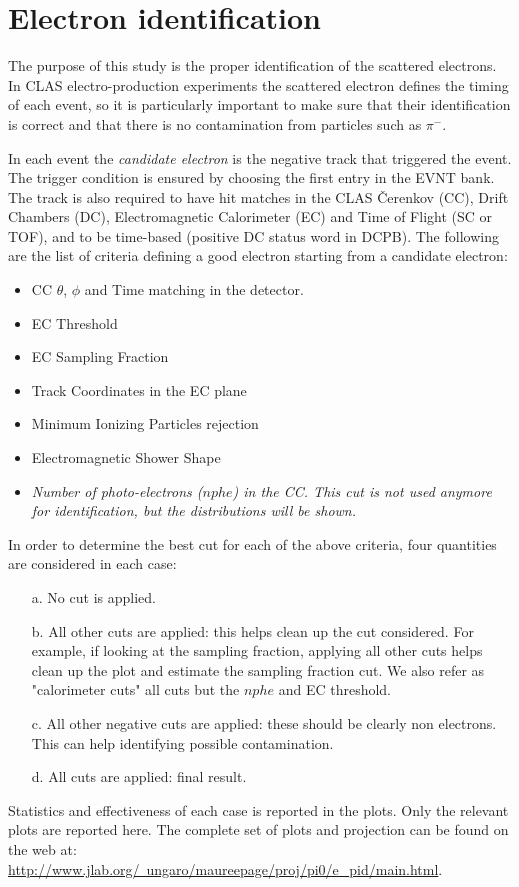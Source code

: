 \clearpage\newpage
\section{Electron identification}

The purpose of this study is the proper identification of the 
scattered electrons. In CLAS electro-production experiments
the scattered electron defines the timing of each event,
so it is particularly important to
make sure that their identification is correct and that
there is no contamination from particles such as $\pi^-$.

In each event the {\it candidate electron} is the negative track
that triggered the event. The trigger condition is ensured by choosing
the first entry in the EVNT bank. The track is also required to have
hit matches in the CLAS \v Cerenkov (CC), Drift Chambers (DC),
Electromagnetic Calorimeter (EC) and Time of Flight (SC or TOF),
and to be time-based (positive DC status word in DCPB).
The following are the list of criteria defining a good electron
starting from a candidate electron:
\begin{itemize}
	\item CC $\theta$, $\phi$ and Time matching in the  detector.
	\item EC Threshold 
	\item EC Sampling Fraction 
	\item Track Coordinates in the EC plane 
	\item Minimum Ionizing Particles rejection 
	\item Electromagnetic Shower Shape
	\item {\it Number of photo-electrons ($nphe$) in the CC.
              This cut is not used anymore for identification,
              but the distributions will be shown. }
\end{itemize}
In order to determine the best cut for each of the above criteria, four quantities
are considered in each case:
\begin{itemize}  
	\item[a.] No cut is applied.
	\item[b.] All other cuts are applied: this helps clean up the cut considered.
	      For example, if looking at the sampling fraction, applying all other
	      cuts helps clean up the plot and estimate the sampling fraction
	      cut. We also refer as "calorimeter cuts" all cuts but the $nphe$ and EC threshold.
	\item[c.] All other negative cuts are applied: these should be clearly non electrons. This
	      can help identifying possible contamination.
	\item[d.] All cuts are applied: final result.
\end{itemize}
Statistics and effectiveness of each case is reported in the plots.
Only the relevant plots are reported here. The complete set of plots and projection can
be found on the web at: \href{http://www.jlab.org/~ungaro/maureepage/proj/pi0/e_pid/main.html}
{http://www.jlab.org/~ungaro/maureepage/proj/pi0/e\_pid/main.html}.

